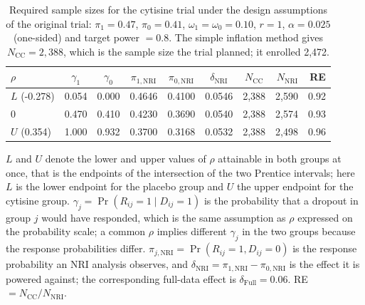 \begin{table}[htbp]
  \centering
  \setlength{\tabcolsep}{4pt}
  \caption{Required sample sizes for the cytisine trial under the design assumptions of the original trial: $\pi_{1} = 0.47$, $\pi_{0} = 0.41$, $\omega_{1} = \omega_{0} = 0.10$, $r = 1$, $\alpha = 0.025$ (one-sided) and target power $= 0.8$. The simple inflation method gives $N_{\mathrm{CC}} = 2{,}388$, which is the sample size the trial planned; it enrolled 2,472.}
  \label{tab:application}
  \begin{threeparttable}
  \begin{tabular}{lccccccrr}
    \toprule
    $\rho$ & $\gamma_{1}$ & $\gamma_{0}$ & $\pi_{1,\mathrm{NRI}}$ & $\pi_{0,\mathrm{NRI}}$ & $\delta_{\mathrm{NRI}}$ & $N_{\mathrm{CC}}$ & $N_{\mathrm{NRI}}$ & RE \\
    \midrule
    $L$ (-0.278) & 0.054 & 0.000 & 0.4646 & 0.4100 & 0.0546 & 2,388 & 2,590 & 0.92 \\
    $0$ & 0.470 & 0.410 & 0.4230 & 0.3690 & 0.0540 & 2,388 & 2,574 & 0.93 \\
    $U$ (0.354) & 1.000 & 0.932 & 0.3700 & 0.3168 & 0.0532 & 2,388 & 2,498 & 0.96 \\
    \bottomrule
  \end{tabular}
  \begin{tablenotes}[flushleft]\footnotesize
    \item $L$ and $U$ denote the lower and upper values of $\rho$ attainable in both groups at once, that is the endpoints of the intersection of the two Prentice intervals; here $L$ is the lower endpoint for the placebo group and $U$ the upper endpoint for the cytisine group. $\gamma_{j} = \Pr(R_{ij} = 1 \mid D_{ij} = 1)$ is the probability that a dropout in group $j$ would have responded, which is the same assumption as $\rho$ expressed on the probability scale; a common $\rho$ implies different $\gamma_{j}$ in the two groups because the response probabilities differ. $\pi_{j,\mathrm{NRI}} = \Pr(R_{ij} = 1, D_{ij} = 0)$ is the response probability an NRI analysis observes, and $\delta_{\mathrm{NRI}} = \pi_{1,\mathrm{NRI}} - \pi_{0,\mathrm{NRI}}$ is the effect it is powered against; the corresponding full-data effect is $\delta_{\mathrm{Full}} = 0.06$. RE $= N_{\mathrm{CC}} / N_{\mathrm{NRI}}$.
  \end{tablenotes}
  \end{threeparttable}
\end{table}
